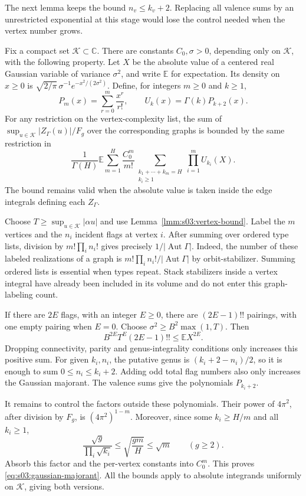 The next lemma keeps the bound $n_v\leq k_v+2$. Replacing all valence
sums by an unrestricted exponential at this stage would lose the
control needed when the vertex number grows.

\begin{lmm}
\label{lmm:s03:pairing-majorant}
Fix a compact set $\mathcal K\subset\mathbb C$. There are constants
$C_0,\sigma>0$, depending only on $\mathcal K$, with the following
property. Let $X$ be the absolute value of a centered real Gaussian
variable of variance $\sigma^2$, and write $\mathbb E$ for expectation.
Its density on $x\geq0$ is
$\sqrt{2/\pi}\,\sigma^{-1}e^{-x^2/(2\sigma^2)}$.
Define, for integers $m\geq0$ and $k\geq1$,
\begin{equation}
\label{eq:s03:counting-polynomials}
P_m(x)=\sum_{r=0}^m\frac{x^r}{r!},\qquad
U_k(x)=\Gamma(k)P_{k+2}(x).
\end{equation}
For any restriction on the vertex-complexity list, the sum of
$\sup_{u\in\mathcal K}|Z_\Gamma(u)|/F_g$ over the corresponding
graphs is bounded by the same restriction in
\begin{equation}
\label{eq:s03:gaussian-majorant}
\frac1{\Gamma(H)}\mathbb E
 \sum_{m=1}^H\frac{C_0^m}{m!}
 \sum_{\substack{k_1+\cdots+k_m=H\\k_i\geq1}}
 \prod_{i=1}^m U_{k_i}(X).
\end{equation}
The bound remains valid when the absolute value is taken inside
the edge integrals defining each $Z_\Gamma$.
\end{lmm}
\begin{prf}
Choose $T\geq\sup_{u\in\mathcal K}|\alpha u|$ and use
Lemma~\ref{lmm:s03:vertex-bound}. Label the $m$ vertices and the
$n_i$ incident flags at vertex $i$. After summing over ordered type
lists, division by $m!\prod_i n_i!$ gives precisely
$1/|\operatorname{Aut}\Gamma|$. Indeed, the number of these labeled
realizations of a graph is $m!\prod_i n_i!/|\operatorname{Aut}\Gamma|$
by orbit-stabilizer. Summing ordered lists is essential when types
repeat. Stack stabilizers inside a vertex integral have already been
included in its volume and do not enter this graph-labeling count.

If there are $2E$ flags, with an integer $E\geq0$, there are
$(2E-1)!!$ pairings, with one empty pairing when $E=0$.
Choose $\sigma^2\geq B^2\max(1,T)$. Then
\[
B^{2E}T^E(2E-1)!!\leq\mathbb E X^{2E}.
\]
Dropping connectivity, parity and genus-integrality conditions only
increases this positive sum. For given $k_i,n_i$, the putative genus
is $(k_i+2-n_i)/2$, so it is enough to sum $0\leq n_i\leq k_i+2$.
Adding odd total flag numbers also only increases the Gaussian
majorant. The valence sums give the polynomials $P_{k_i+2}$.

It remains to control the factors outside these polynomials. Their
power of $4\pi^2$, after division by $F_g$, is $(4\pi^2)^{1-m}$.
Moreover, since some $k_i\geq H/m$ and all $k_i\geq1$,
\[
\frac{\sqrt g}{\prod_i\sqrt{k_i}}
\leq\sqrt{\frac{gm}{H}}\leq\sqrt m\qquad(g\geq2).
\]
Absorb this factor and the per-vertex constants into $C_0^m$.
This proves \eqref{eq:s03:gaussian-majorant}. All the bounds apply
to absolute integrands uniformly on $\mathcal K$, giving both versions.
\end{prf}

